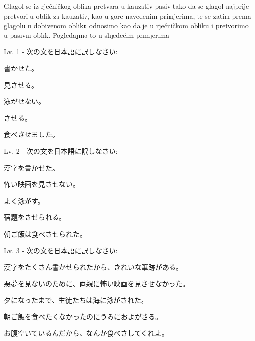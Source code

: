 	Glagol se iz rječničkog oblika pretvara u kauzativ pasiv tako da se glagol najprije pretvori u oblik za kauzativ, kao u gore navedenim primjerima, te se zatim prema glagolu u dobivenom obliku odnosimo kao da je u rječničkom obliku i pretvorimo u pasivni oblik. Pogledajmo to u slijedećim primjerima:\\
 
	\begin{reibun}
	\end{reibun}

	\newpage		
		
	\begin{mondai}{Lv. 1 - 次の文を日本語に訳しなさい: }
		\item 書かせた。
		\item 見させる。
		\item 泳がせない。
		\item させる。
		\item 食べさせました。
	\end{mondai}
		
	\begin{mondai}{Lv. 2 - 次の文を日本語に訳しなさい: }
		\item 漢字を書かせた。
		\item 怖い映画を見させない。
		\item よく泳がす。
		\item 宿題をさせられる。
		\item 朝ご飯は食べさせられた。
	\end{mondai}
	
	\begin{mondai}{Lv. 3 - 次の文を日本語に訳しなさい: }
		\item 漢字をたくさん書かせられたから、きれいな筆跡がある。
		\item 悪夢を見ないのために、両親に怖い映画を見させなかった。
		\item 夕になったまで、生徒たちは海に泳がされた。
		\item 朝ご飯を食べたくなかったのにうみにおよがさる。
		\item お腹空いているんだから、なんか食べさしてくれよ。\footnotemark[1]
	\end{mondai}

